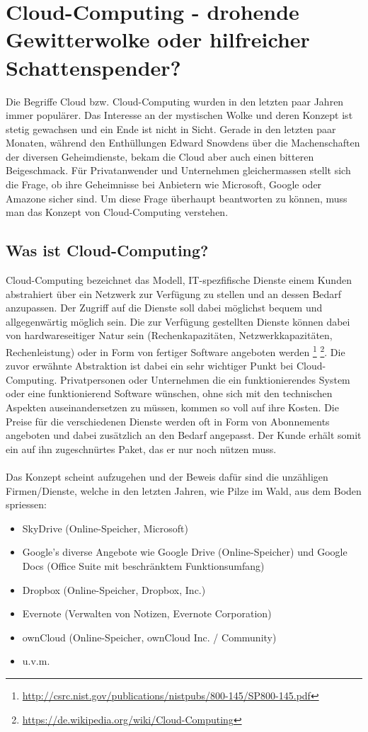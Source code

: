 \newpage
\section{Cloud-Computing - drohende Gewitterwolke oder hilfreicher Schattenspender?}
Die Begriffe Cloud bzw. Cloud-Computing wurden in den letzten paar Jahren immer populärer. Das Interesse an der mystischen Wolke und deren Konzept ist stetig gewachsen und ein Ende ist nicht in Sicht. Gerade in den letzten paar Monaten, während den Enthüllungen Edward Snowdens über die Machenschaften der diversen Geheimdienste, bekam die Cloud aber auch einen bitteren Beigeschmack. Für Privatanwender und Unternehmen gleichermassen stellt sich die Frage, ob ihre Geheimnisse bei Anbietern wie Microsoft, Google oder Amazone sicher sind. Um diese Frage überhaupt beantworten zu können, muss man das Konzept von Cloud-Computing verstehen.

\subsection{Was ist Cloud-Computing?}
Cloud-Computing bezeichnet das Modell, IT-spezfifische Dienste einem Kunden abstrahiert über ein Netzwerk zur Verfügung zu stellen und an dessen Bedarf anzupassen. Der Zugriff auf die Dienste soll dabei möglichst bequem und allgegenwärtig möglich sein. Die zur Verfügung gestellten Dienste können dabei von hardwareseitiger Natur sein (Rechenkapazitäten, Netzwerkkapazitäten, Rechenleistung) oder in Form von fertiger Software angeboten werden 
\footnote{\url{http://csrc.nist.gov/publications/nistpubs/800-145/SP800-145.pdf}} 
\footnote{\url{https://de.wikipedia.org/wiki/Cloud-Computing}}. 
Die zuvor erwähnte Abstraktion ist dabei ein sehr wichtiger Punkt bei Cloud-Computing. Privatpersonen oder Unternehmen die ein funktionierendes System oder eine funktionierend Software wünschen, ohne sich mit den technischen Aspekten auseinandersetzen zu müssen, kommen so voll auf ihre Kosten. Die Preise für die verschiedenen Dienste werden oft in Form von Abonnements angeboten und dabei zusätzlich an den Bedarf angepasst. Der Kunde erhält somit ein auf ihn zugeschnürtes Paket, das er nur noch nützen muss.
\\
\\
Das Konzept scheint aufzugehen und der Beweis dafür sind die unzähligen Firmen/Dienste, welche in den letzten Jahren, wie Pilze im Wald, aus dem Boden spriessen:
\begin{itemize}
\item SkyDrive (Online-Speicher, Microsoft)
\item Google's diverse Angebote wie Google Drive (Online-Speicher) und Google Docs (Office Suite mit beschränktem Funktionsumfang)
\item Dropbox (Online-Speicher, Dropbox, Inc.)
\item Evernote (Verwalten von Notizen, Evernote Corporation)
\item ownCloud (Online-Speicher, ownCloud Inc. / Community)
\item u.v.m.
\end{itemize}

